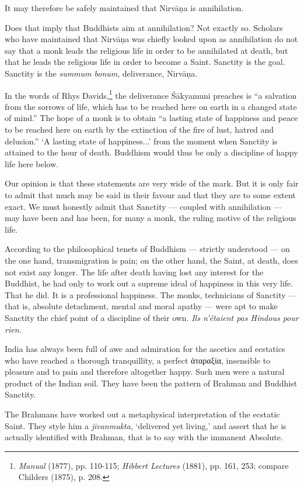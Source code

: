 \documentclass[a4paper, 11pt, oneside, english]{article}
\begin{document}
It may therefore be safely maintained that Nirvāṇa is annihilation.

Does that imply that Buddhists aim at annihilation? Not exactly so. Scholars who have maintained that Nirvāṇa was chiefly looked upon as annihilation do not say that a monk leads the religious life in order to be annihilated at death, but that he leads the religious life in order to become a Saint. Sanctity is the goal. Sanctity is the \emph{summum bonum}, deliverance, Nirvāṇa.

In the words of Rhys Davids,\footnote{\emph{Manual} (1877), pp. 110-115; \emph{Hibbert Lectures} (1881), pp. 161, 253; compare Childers (1875), p. 208.} the deliverance Śākyamuni preaches is ``a salvation from the sorrows of life, which has to be reached here on earth in a changed state of mind.'' The hope of a monk is to obtain ``a lasting state of happiness and peace to be reached here on earth by the extinction of the fire of lust, hatred and delusion.'' `A lasting state of happiness...' from the moment when Sanctity is attained to the hour of death. Buddhism would thus be only a discipline of happy life here below.

Our opinion is that these statements are very wide of the mark. But it is only fair to admit that much may be said in their favour and that they are to some extent exact. We must honestly admit that Sanctity --- coupled with annihilation --- may have been and has been, for many a monk, the ruling motive of the religious life.

According to the philosophical tenets of Buddhism --- strictly understood --- on the one hand, transmigration is pain; on the other hand, the Saint, at death, does not exist any longer. The life after death having lost any interest for the Buddhist, he had only to work out a supreme ideal of happiness in this very life. That he did. It is a professional happiness. The monks, technicians of Sanctity --- that is, absolute detachment, mental and moral apathy --- were apt to make Sanctity the chief point of a discipline of their own. \emph{Ils n'étaient pas Hindous pour rien.}

India has always been full of awe and admiration for the ascetics and ecstatics who have reached a thorough tranquillity, a perfect ἀταραξία, insensible to pleasure and to pain and therefore altogether happy. Such men were a natural product of the Indian soil. They have been the pattern of Brahman and Buddhist Sanctity.

The Brahmans have worked out a metaphysical interpretation of the ecstatic Saint. They style him a \emph{jīvanmukta}, `delivered yet living,' and assert that he is actually identified with Brahman, that is to say with the immanent Absolute.
\end{document}
